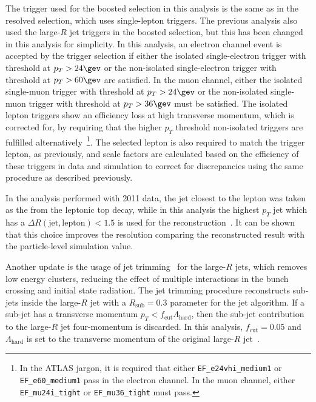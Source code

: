 The trigger used for the boosted selection in this analysis is the same as in the resolved selection, which uses single-lepton triggers. The previous analysis
also used the large-$R$ jet triggers in the boosted selection, but this has been changed in this analysis for simplicity. In this analysis, an electron channel
event is accepted
by the trigger selection if either the isolated single-electron trigger with threshold at $p_T > 24\gev$ or the non-isolated single-electron trigger with threshold at
$p_T > 60\gev$ are satisfied. In the muon channel, either the isolated single-muon trigger with threshold at $p_T > 24\gev$ or the non-isolated single-muon trigger
with threshold at $p_T > 36\gev$ must be satisfied. The isolated lepton triggers show an efficiency loss at high transverse momentum, which is
corrected for, by requiring that the higher $p_T$ threshold non-isolated triggers are fulfilled alternatively~\footnote{In the ATLAS jargon, it is required
that either \texttt{EF\_e24vhi\_medium1} or \texttt{EF\_e60\_medium1} pass in the electron channel. In the muon channel, either \texttt{EF\_mu24i\_tight} or
\texttt{EF\_mu36\_tight} must pass.}.
The selected lepton is also required to match the trigger lepton, as previously, and scale factors are calculated based on the efficiency of these triggers in
data and simulation to correct for discrepancies using the same procedure as described previously.

In the analysis performed with 2011 data, the jet closest to the lepton was
taken as the \bjet from the leptonic top decay, while in this analysis the highest $p_T$ jet which has a $\Delta R(\textrm{jet}, \textrm{lepton}) < 1.5$ is used for the \mtt
reconstruction~\cite{ttres8note,ttres7paper}. It can be shown~\cite{ttres8note} that this choice improves the \mtt resolution comparing the reconstructed result with the
particle-level simulation value.

Another update is the usage of jet trimming~\cite{trimming} for the large-$R$ jets, which removes low energy clusters, reducing the effect of multiple interactions
in the bunch crossing and initial state radiation. The jet trimming procedure reconstructs sub-jets inside the large-$R$ jet with a $R_{\textrm{sub}} = 0.3$ parameter for the
jet algorithm. If a sub-jet has a transverse momentum $p_T < f_{\textrm{cut}} \Lambda_{\textrm{hard}}$, then the sub-jet contribution to the large-$R$ jet four-momentum
is discarded. In this analysis, $f_{\textrm{cut}} = 0.05$ and $\Lambda_{\textrm{hard}}$ is set to the transverse momentum of the original large-$R$ jet~\cite{ttres8note}.


